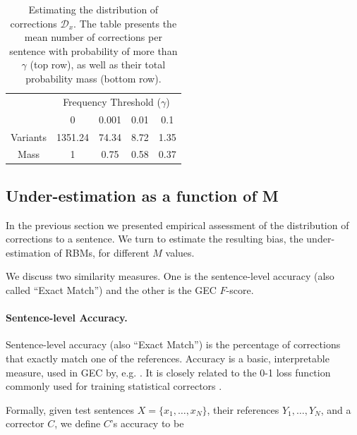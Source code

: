 \documentclass[letter,11pt]{article}
\begin{document}
\begin{table}[h!]
	\vspace{-0.5cm}
  \centering
  \small
  \singlespacing
  \begin{tabular}{c|c|c|c|c|}
    & \multicolumn{4}{c|}{Frequency Threshold ($\gamma$)}\\ 
    & \multicolumn{1}{c}{0} & \multicolumn{1}{c}{0.001} & \multicolumn{1}{c}{0.01} & \multicolumn{1}{c|}{0.1}
    \\
    \hline
    Variants & 1351.24 & 74.34 & 8.72 & 1.35
    \\
    Mass & 1 & 0.75 & 0.58 & 0.37\\
    \hline
  \end{tabular}
  \caption{\label{tab:corrections_dist}
    Estimating the distribution of corrections $\mathcal{D}_x$.
    The table presents the mean number of corrections per sentence with probability of more than
    $\gamma$ (top row), as well as their total probability mass (bottom row).
  }
  \vspace{-0.5cm}
\end{table}
%
\subsection{Under-estimation as a function of M} \label{subsec:Assessment-values}
In the previous section we presented empirical assessment of the distribution of corrections to a sentence. We turn to estimate the resulting bias, the under-estimation of RBMs, for different $M$ values. 

We discuss two similarity measures. One is the sentence-level accuracy
(also called ``Exact Match'') and the other is the GEC $F$-score.

\paragraph{Sentence-level Accuracy.}
Sentence-level accuracy (also ``Exact Match'') is the percentage of corrections that
exactly match one of the references.
Accuracy is a basic, interpretable measure, used in GEC by, e.g. \cite{rozovskaya2010annotating}.
It is closely related to the 0-1 loss function commonly used
for training statistical correctors \cite{chodorow2012problems,rozovskaya2013joint}. 

Formally, given test sentences $X=\{x_1,\ldots,x_N\}$,
their references $Y_1,\ldots,Y_N$, and a corrector $C$,
we define $C$'s accuracy to be
\end{document}
